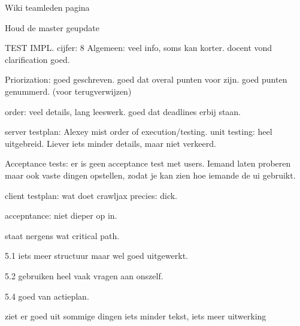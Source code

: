 Wiki teamleden pagina

Houd de master geupdate

TEST IMPL.
cijfer: 8
Algemeen:
veel info, soms kan korter.
docent vond clarification goed.

Priorization:
goed geschreven.
goed dat overal punten voor zijn.
goed punten genummerd. (voor terugverwijzen)

order:
veel details, lang leeswerk.
goed dat deadlines erbij staan.

server testplan:
Alexey mist order of execution/testing.
unit testing:
heel uitgebreid.
Liever iets minder details, maar niet verkeerd.

Acceptance tests:
er is geen acceptance test met users.
Iemand laten proberen maar ook vaste dingen opstellen, zodat je kan zien hoe iemande de ui gebruikt.

client testplan:
wat doet crawljax precies: dick.

accepntance:
niet dieper op in.

staat nergens wat critical path.

5.1 iets meer structuur maar wel goed uitgewerkt.

5.2 gebruiken heel vaak vragen aan onszelf.

5.4 goed van actieplan.

ziet er goed uit
sommige dingen iets minder tekst, iets meer uitwerking


